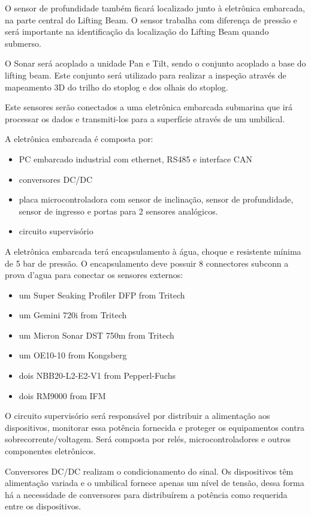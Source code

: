 O sensor de profundidade também ficará localizado junto à eletrônica embarcada,
na parte central do Lifting Beam. O sensor trabalha com diferença de pressão e
será importante na identificação da localização do Lifting Beam quando submerso.

O Sonar será acoplado a unidade Pan e Tilt, sendo o conjunto acoplado a base do lifting beam. Este conjunto será utilizado para realizar a inspeção através de mapeamento 3D do trilho do stoplog e dos olhais do stoplog. 

Este sensores serão conectados a uma eletrônica embarcada submarina que irá processar os dados e transmiti-los para a superfície através de um umbilical. 

A eletrônica embarcada é composta por: 

\begin{itemize}
	\item PC embarcado industrial com ethernet, RS485 e interface CAN
	\item  conversores DC/DC
	\item  placa microcontroladora com sensor de inclinação, sensor de profundidade, sensor de ingresso 	 	e portas para 2 sensores analógicos. 
	\item circuito supervisório
\end{itemize}

A eletrônica embarcada terá encapsulamento à  água,
choque e resistente mínima de 5 bar de pressão. O encapsulamento deve possuir 8 connectores subconn a prova d'agua para conectar os sensores externos: 

\begin{itemize}
 	\item um Super Seaking Profiler DFP from Tritech
 	\item um Gemini 720i from Tritech
	\item um Micron Sonar DST 750m from Tritech
	\item um OE10-10 from Kongsberg
	\item dois NBB20-L2-E2-V1 from Pepperl-Fuchs
	\item dois RM9000 from IFM 
\end{itemize}

O circuito supervisório será responsável por distribuir a alimentação aos
dispositivos, monitorar essa potência fornecida e proteger os equipamentos
contra sobrecorrente/voltagem. Será composta por relés, microcontroladores e
outros componentes eletrônicos.

Conversores DC/DC realizam o condicionamento do sinal. Os dispositivos têm
alimentação variada e o umbilical fornece apenas um nível de tensão, dessa forma
há a necessidade de conversores para distribuírem a potência como requerida
entre os dispositivos.


